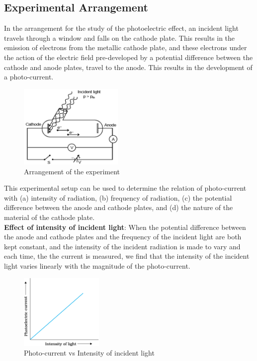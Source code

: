 \documentclass{article}
\begin{document}
\subsection{Experimental Arrangement}
In the arrangement for the study of the photoelectric effect, an incident light travels through a window and falls on the cathode plate. This results in the emission of electrons from the metallic cathode plate, and these electrons under the action of the electric field pre-developed by a potential difference between the cathode and anode plates, travel to the anode. This results in the development of a photo-current. 
    \begin{figure}[htp]
    \centering
    \includegraphics[width=5cm]{cr2.png}
    \caption{Arrangement of the experiment}
    \label{fig:galaxy}
    \end{figure}

This experimental setup can be used to determine the relation of photo-current with (a) intensity of radiation, (b) frequency of radiation, (c) the potential difference between the anode and cathode plates, and (d) the nature of the material of the cathode plate. \\ 

\textbf{Effect of intensity of incident light}: When the potential difference between the anode and cathode plates and the frequency of the incident light are both kept constant, and the intensity of the incident radiation is made to vary and each time, the the current is measured, we find that the intensity of the incident light varies linearly with the magnitude of the photo-current. 

\begin{figure}[htp]
    \centering
    \includegraphics[width=4cm]{cr3.png}
    \caption{Photo-current vs Intensity of incident light}
    \label{fig:galaxy}
    \end{figure}
\newpage
\end{document}
